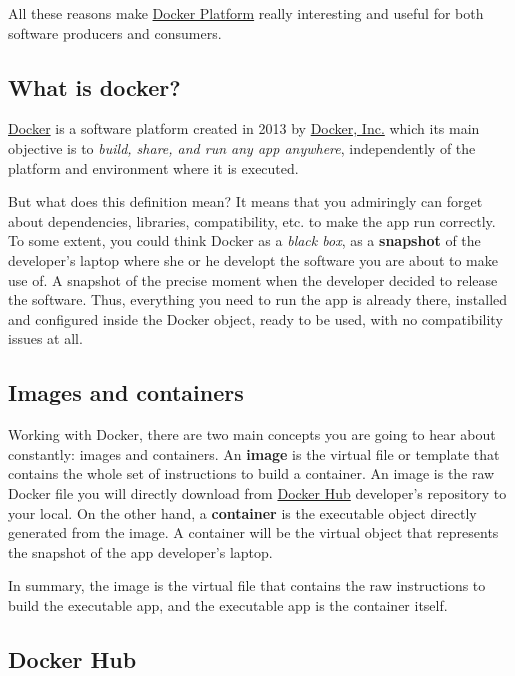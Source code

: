 \documentclass[]{book}
\begin{document}
All these reasons make \href{https://www.docker.com/}{Docker Platform}
really interesting and useful for both software producers and consumers.

\subsection{What is docker?}\label{what-is-docker}

\href{https://www.docker.com/}{Docker} is a software platform created in
2013 by \href{https://en.wikipedia.org/wiki/Docker,_Inc.}{Docker, Inc.}
which its main objective is to \emph{build, share, and run any app
anywhere}, independently of the platform and environment where it is
executed.

But what does this definition mean? It means that you admiringly can
forget about dependencies, libraries, compatibility, etc. to make the
app run correctly. To some extent, you could think Docker as a
\emph{black box}, as a \textbf{snapshot} of the developer's laptop where
she or he developt the software you are about to make use of. A snapshot
of the precise moment when the developer decided to release the
software. Thus, everything you need to run the app is already there,
installed and configured inside the Docker object, ready to be used,
with no compatibility issues at all.

\subsection{Images and containers}\label{images-and-containers}

Working with Docker, there are two main concepts you are going to hear
about constantly: images and containers. An \textbf{image} is the
virtual file or template that contains the whole set of instructions to
build a container. An image is the raw Docker file you will directly
download from \href{https://hub.docker.com/}{Docker Hub} developer's
repository to your local. On the other hand, a \textbf{container} is the
executable object directly generated from the image. A container will be
the virtual object that represents the snapshot of the app developer's
laptop.

In summary, the image is the virtual file that contains the raw
instructions to build the executable app, and the executable app is the
container itself.

\subsection{Docker Hub}\label{docker-hub}
\end{document}
